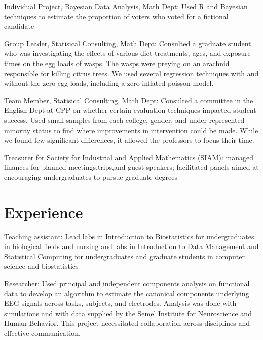 \documentclass[]{deedy-resume-openfont}
\begin{document}
\vspace{-.25em}
\begin{tightemize}
\item Individual Project, Bayesian Data Analysis, Math Dept: Used R and Bayesian techniques to estimate the proportion of voters who voted for a fictional candidate
\item Group Leader, Statisical Consulting, Math Dept: Consulted a graduate student who was investigating the effects of various diet treatments, ages, and exposure times on the egg loads of wasps. The wasps were preying on an arachnid responsible for killing citrus trees. We used several regression techniques with and without the zero egg loads, including a zero-inflated poisson model.
\item Team Member, Statisical Consulting, Math Dept: Consulted a committee in the English Dept at CPP on whether certain evaluation techniques impacted student success. Used small samples from each college, gender, and under-represented minority status to find where improvements in intervention could be made. While we found few significant differences, it allowed the professors to focus their time.
\item Treasurer for Society for Industrial and Applied Mathematics (SIAM): managed finances for planned meetings,trips,and guest speakers; facilitated panels aimed at encouraging undergraduates to pursue graduate degrees
\end{tightemize}
\sectionsep

\section{Experience}

\vspace{-.25em} %
\begin{tightemize}
\item Teaching assistant: Lead labs in Introduction to Biostatistics for undergraduates in biological fields and nursing and labs in Introduction to Data Management and Statistical Computing for undergraduates and graduate students in computer science and biostatistics 
\item Researcher: Used principal and independent components analysis on functional data to develop an algorithm to estimate the canonical components underlying EEG signals across tasks, subjects, and electrodes. Analysis was done with simulations and with data supplied by the Semel Institute for Neuroscience and Human Behavior. This project necessitated collaboration across disciplines and effective communication. 
\end{tightemize}
\sectionsep
\end{document}
